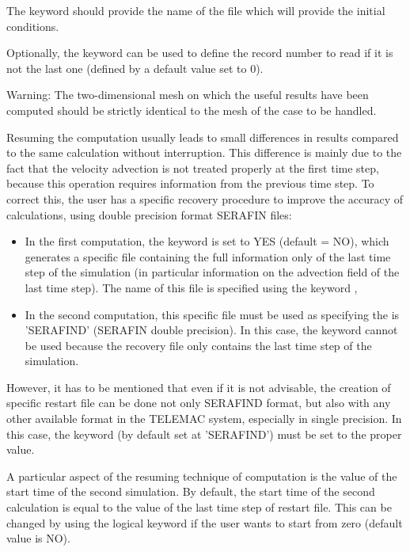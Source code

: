 The keyword  should provide the name of the
file which will provide the initial conditions.

Optionally, the keyword  can be used to
define the record number to read if it is not the last one (defined by a
default value set to 0).

\begin{WarningBlock}{Warning:}
The two-dimensional mesh on which the useful results have been computed should
be strictly identical to the mesh of the case to be handled.
\end{WarningBlock}

Resuming the computation usually leads to small differences in results
compared to the same calculation without interruption. This difference is
mainly due to the fact that the velocity advection is not treated properly at
the first time step, because this operation requires information from the
previous time step. To correct this, the user has a specific recovery procedure
to improve the accuracy of calculations, using double precision format SERAFIN
files:

\begin{itemize}
\item In the first computation, the keyword  is set to
YES (default = NO),
which generates a specific file containing the full information only of
the last time step of the simulation (in particular information on the
advection field of the last time step). The name of this file is specified
using the keyword ,

\item In the second computation, this specific file must be used as
 specifying the  is 'SERAFIND' (SERAFIN double precision). In this case, the
keyword  cannot be used because the recovery
file only contains the last time step of the simulation.
\end{itemize}

However, it has to be mentioned that even if it is not advisable, the creation
of specific restart file can be done not only SERAFIND format, but also with
any other available format in the TELEMAC system, especially in single
precision. In this case, the keyword  (by default
set at 'SERAFIND') must be set to the proper value.

A particular aspect of the resuming technique of computation is the value of
the start time of the second simulation. By default, the start time of the
second calculation is equal to the value of the last time step of restart file.
This can be changed by using the logical keyword  if the user wants to start from zero (default value is NO).

